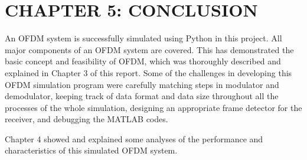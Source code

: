 \section*{CHAPTER 5: CONCLUSION}
\setcounter{section}{2}
\setcounter{subsection}{0}
\setcounter{figure}{0}
\setcounter{table}{0}

An OFDM system is successfully simulated using Python in this project. All major components of an OFDM system are covered. This has demonstrated the basic concept and feasibility of OFDM, which was thoroughly described and explained in Chapter 3 of this report. Some of the challenges in developing this OFDM simulation program were carefully matching steps in modulator and demodulator, keeping track of data format and data size throughout all the processes of the whole simulation, designing an appropriate frame detector for the receiver, and debugging the MATLAB codes.

Chapter 4 showed and explained some analyses of the performance and characteristics of this simulated OFDM system.